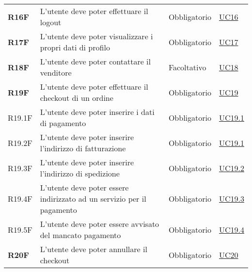 \begin{center}
\begin{longtable}[!h]{p{50px} p{245px} p{75px} p{50px}}
        \textbf{R16F}                         & L'utente deve poter effettuare il logout                                                                   & Obbligatorio             & \hyperref[sec:UC16]{UC16}                    \\
        \textbf{R17F}                         & L'utente deve poter visualizzare i propri dati di profilo                                                  & Obbligatorio             & \hyperref[sec:UC17]{UC17}                    \\
        \textbf{R18F}                         & L'utente deve poter contattare il venditore                                                                & Facoltativo             & \hyperref[sec:UC18]{UC18}                    \\
        \textbf{R19F}                         & L'utente deve poter effettuare il checkout di un ordine                                                    & Obbligatorio             & \hyperref[sec:UC19]{UC19}                    \\
        R19.1F                                & L'utente deve poter inserire i dati di pagamento                                                           & Obbligatorio             & \hyperref[sec:UC19.1]{UC19.1}                \\
        R19.2F                                & L'utente deve poter inserire l'indirizzo di fatturazione                                                   & Obbligatorio             & \hyperref[sec:UC19.1]{UC19.1}                \\
        R19.3F                                & L'utente deve poter inserire l'indirizzo di spedizione                                                     & Obbligatorio             & \hyperref[sec:UC19.2]{UC19.2}                \\
        R19.4F                                & L'utente deve poter essere indirizzato ad un servizio per il pagamento                                     & Obbligatorio             & \hyperref[sec:UC19.3]{UC19.3}                \\
        R19.5F                                & L'utente deve poter essere avvisato del mancato pagamento                                                  & Obbligatorio             & \hyperref[sec:UC19.4]{UC19.4}                \\
        \textbf{R20F}                         & L'utente deve poter annullare il checkout                                                                  & Obbligatorio             & \hyperref[sec:UC20]{UC20}                    \\

\end{longtable}
\end{center}
